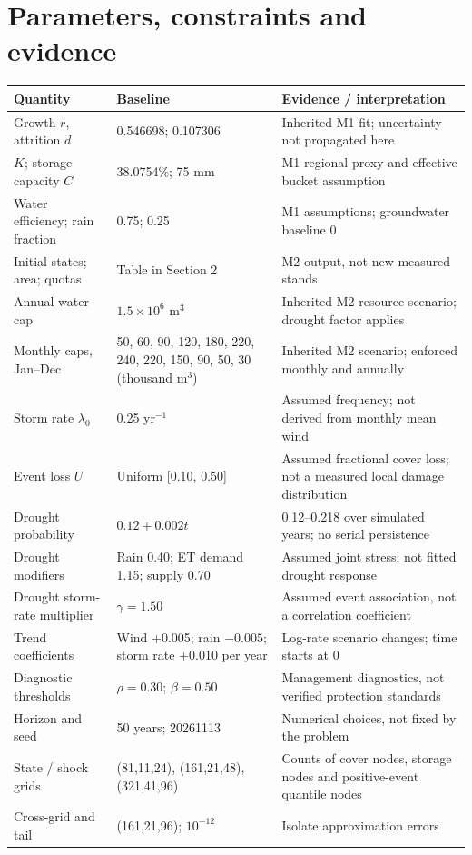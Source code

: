 \documentclass[11pt,a4paper]{article}
\begin{document}
\clearpage
\section{Parameters, constraints and evidence}
\begin{tabularx}{\textwidth}{@{}p{3.3cm}p{4.0cm}Y@{}}
\toprule Quantity & Baseline & Evidence / interpretation \\\midrule
Growth $r$, attrition $d$ & 0.546698; 0.107306 & Inherited M1 fit; uncertainty not propagated here \\
$K$; storage capacity $C$ & 38.0754\%; 75 mm & M1 regional proxy and effective bucket assumption \\
Water efficiency; rain fraction & 0.75; 0.25 & M1 assumptions; groundwater baseline 0 \\
Initial states; area; quotas & Table in Section 2 & M2 output, not new measured stands \\
Annual water cap & $1.5\times10^6$ m$^3$ & Inherited M2 resource scenario; drought factor applies \\
Monthly caps, Jan--Dec & 50, 60, 90, 120, 180, 220, 240, 220, 150, 90, 50, 30 (thousand m$^3$) & Inherited M2 scenario; enforced monthly and annually \\
Storm rate $\lambda_0$ & 0.25 yr$^{-1}$ & Assumed frequency; not derived from monthly mean wind \\
Event loss $U$ & Uniform [0.10, 0.50] & Assumed fractional cover loss; not a measured local damage distribution \\
Drought probability & $0.12+0.002t$ & 0.12--0.218 over simulated years; no serial persistence \\
Drought modifiers & Rain 0.40; ET demand 1.15; supply 0.70 & Assumed joint stress; not fitted drought response \\
Drought storm-rate multiplier & $\gamma=1.50$ & Assumed event association, not a correlation coefficient \\
Trend coefficients & Wind +0.005; rain $-0.005$; storm rate +0.010 per year & Log-rate scenario changes; time starts at 0 \\
Diagnostic thresholds & $\rho=0.30$; $\beta=0.50$ & Management diagnostics, not verified protection standards \\
Horizon and seed & 50 years; 20261113 & Numerical choices, not fixed by the problem \\
State / shock grids & (81,11,24), (161,21,48), (321,41,96) & Counts of cover nodes, storage nodes and positive-event quantile nodes \\
Cross-grid and tail & (161,21,96); $10^{-12}$ & Isolate approximation errors \\
\bottomrule
\end{tabularx}
\end{document}
